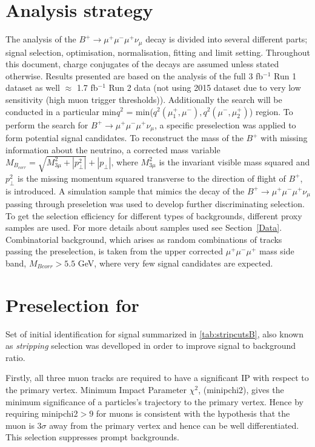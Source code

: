 \section{Analysis strategy}
\label{Strategy}

The analysis of the $B^{+} \rightarrow \mu^{+} \mu^{-} \mu^{+} \nu_\mu$ decay is divided into several different parts; signal selection, optimisation, normalisation, fitting and limit setting. Throughout this document, charge conjugates of the decays are assumed unless stated otherwise. Results presented are based on the analysis of the full 3 fb$^{-1}$ Run 1 dataset as well $\approx$ 1.7 fb$^{-1}$ Run 2 data (not using 2015 dataset due to very low sensitivity (high muon trigger thresholds)). Additionally the search will be conducted in a particular min$q^{2}$ = min($q^{2}(\mu_{1}^{+},\mu^{-}), q^2(\mu^{-},\mu_{2}^{+})$) region.
\newline To perform the search for $B^{+} \rightarrow \mu^{+} \mu^{-} \mu^{+} \nu_\mu$, a specific preselection was applied to form potential signal candidates. To reconstruct the mass of the $B^{+}$ with missing information about the neutrino, a corrected mass variable $M_{B_{corr}} = \sqrt{M_{3\mu}^{2} + |p^{2}_{\perp}|} + |p_{\perp}|$, where $M_{3\mu}^{2}$ is the invariant visible mass squared and $p^{2}_{\perp}$ is the missing momentum squared transverse to the direction of flight of $B^{+}$, is introduced. A simulation sample that mimics the decay of the $B^{+} \rightarrow \mu^{+} \mu^{-} \mu^{+} \nu_\mu$ passing through preseletion was used to develop further discriminating selection. To get the selection efficiency for different types of backgrounds, different proxy samples are used. For more details about samples used see Section~\ref{Data}.
\newline Combinatorial background, which arises as random combinations of tracks passing the preselection, is taken from the upper corrected $\mu^{+} \mu^{-} \mu^{+}$ mass side band, $M_{Bcorr} > 5.5$ GeV, where very few signal candidates are expected.

\section{Preselection for \Bmumumu}

Set of initial identification for signal \Bmumumu summarized in \autoref{tab:stripcutsB}, also known as \textit{stripping} selection was develloped in order to improve signal to background ratio. 

Firstly, all three muon tracks are required to have a significant \Gls{IP} with respect to the primary vertex. Minimum Impact Parameter $\chi^{2}$, (\Gls{minipchi2}), gives the minimum significance of a particles's trajectory to the primary vertex. Hence by requiring \Gls{minipchi2}$>9$ for muons is consistent with the hypothesis that the muon is $3\sigma$ away from the primary vertex and hence can be well differentiated. This selection suppresses prompt backgrounds. 

